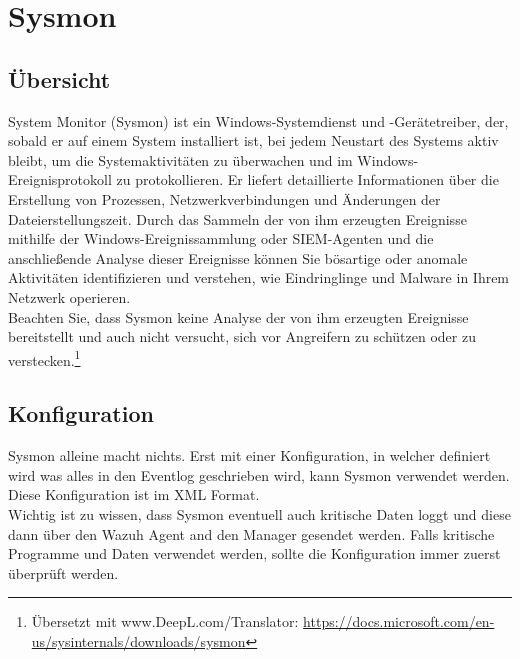 \chapter{Sysmon}
\section{Übersicht}
System Monitor (Sysmon) ist ein Windows-Systemdienst und -Gerätetreiber, der, sobald er auf einem System installiert ist, bei jedem Neustart des Systems aktiv bleibt, um die Systemaktivitäten zu überwachen und im Windows-Ereignisprotokoll zu protokollieren. Er liefert detaillierte Informationen über die Erstellung von Prozessen, Netzwerkverbindungen und Änderungen der Dateierstellungszeit. Durch das Sammeln der von ihm erzeugten Ereignisse mithilfe der Windows-Ereignissammlung oder SIEM-Agenten und die anschließende Analyse dieser Ereignisse können Sie bösartige oder anomale Aktivitäten identifizieren und verstehen, wie Eindringlinge und Malware in Ihrem Netzwerk operieren.\\

Beachten Sie, dass Sysmon keine Analyse der von ihm erzeugten Ereignisse bereitstellt und auch nicht versucht, sich vor Angreifern zu schützen oder zu verstecken.\footnote{Übersetzt mit www.DeepL.com/Translator: \href{https://docs.microsoft.com/en-us/sysinternals/downloads/sysmon}{https://docs.microsoft.com/en-us/sysinternals/downloads/sysmon}}

\section{Konfiguration}
Sysmon alleine macht nichts. 
Erst mit einer Konfiguration, in welcher definiert wird was alles in den Eventlog geschrieben wird, kann Sysmon verwendet werden.
Diese Konfiguration ist im XML Format. \\

Wichtig ist zu wissen, dass Sysmon eventuell auch kritische Daten loggt und diese dann über den Wazuh Agent and den Manager gesendet werden.
Falls kritische Programme und Daten verwendet werden, sollte die Konfiguration immer zuerst überprüft werden.
